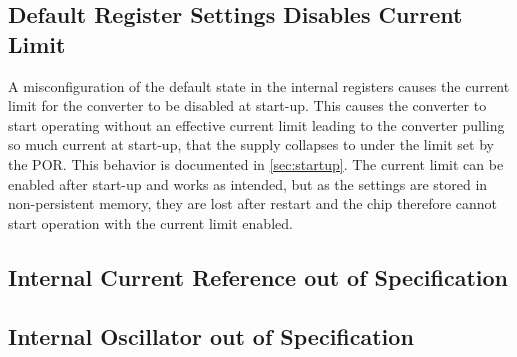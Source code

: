 \subsection{Default Register Settings Disables Current Limit}
\label{sec:missingcurrentlimit}

A misconfiguration of the default state in the internal registers causes the current limit for the converter to be disabled at start-up. This causes the converter to start operating without an effective current limit leading to the converter pulling so much current at start-up, that the supply collapses to under the limit set by the \ac{POR}. This behavior is documented in \autoref{sec:startup}. The current limit can be enabled after start-up and works as intended, but as the settings are stored in non-persistent memory, they are lost after restart and the chip therefore cannot start operation with the current limit enabled. 


\subsection{Internal Current Reference out of Specification}

\subsection{Internal Oscillator out of Specification}